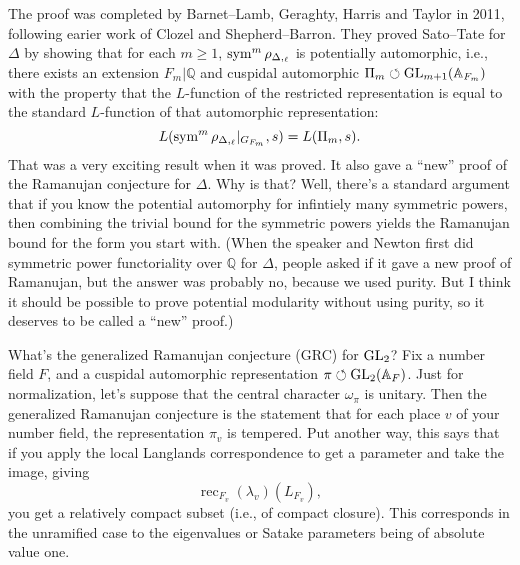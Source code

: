 \documentclass[reqno]{amsart} 
\begin{document}
The proof was completed by Barnet--Lamb, Geraghty, Harris and Taylor in 2011, following earier work of Clozel and Shepherd--Barron.  They proved Sato--Tate for $\Delta$ by showing that for each $m \geq 1$, $\operatorname{sym}^m \rho_{\Delta,_{\ell}}$ is potentially automorphic, i.e., there exists an extension $F_m | \mathbb{Q}$ and cuspidal automorphic $\Pi_m \circlearrowleft \operatorname{GL}_{m + 1}(\mathbb{A}_{F_m})$ with the property that the $L$-function of the restricted representation is equal to the standard $L$-function of that automorphic representation:
\begin{equation*}
  L(\operatorname{sym}^m \rho_{\Delta,_{\ell}} | _{G_{F_m}}, s)
  =
  L(\Pi_m, s).
\end{equation*}
That was a very exciting result when it was proved.  It also gave a ``new'' proof of the Ramanujan conjecture for $\Delta$.  Why is that?  Well, there's a standard argument that if you know the potential automorphy for infintiely many symmetric powers, then combining the trivial bound for the symmetric powers yields the Ramanujan bound for the form you start with.  (When the speaker and Newton first did symmetric power functoriality over $\mathbb{Q}$ for $\Delta$, people asked if it gave a new proof of Ramanujan, but the answer was probably no, because we used purity.  But I think it should be possible to prove potential modularity without using purity, so it deserves to be called a ``new'' proof.)

What's the generalized Ramanujan conjecture (GRC) for $\operatorname{GL}_2$?  Fix a number field $F$, and a cuspidal automorphic representation $\pi \circlearrowleft \operatorname{GL}_2(\mathbb{A}_F)$.  Just for normalization, let's suppose that the central character $\omega_\pi$ is unitary.  Then the generalized Ramanujan conjecture is the statement that for each place $v$ of your number field, the representation $\pi_v$ is tempered.  Put another way, this says that if you apply the local Langlands correspondence to get a parameter and take the image, giving
\begin{equation*}
  \operatorname{rec}_{F_v}(\lambda_v)(L_{F_v}),
\end{equation*}
you get a relatively compact subset (i.e., of compact closure).  This corresponds in the unramified case to the eigenvalues or Satake parameters being of absolute value one.
\end{document}
